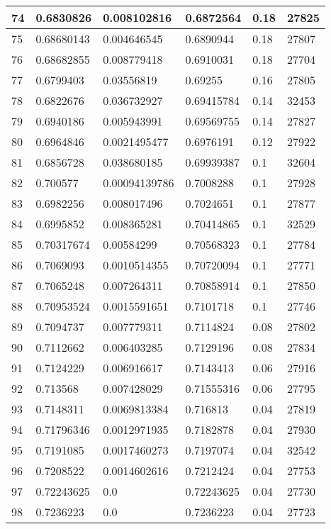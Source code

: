 \begin{longtable}{|l|l|l|l|l|l|}
74 & 0.6830826 & 0.008102816 & 0.6872564 & 0.18 & 27825 \\ \hline 
75 & 0.68680143 & 0.004646545 & 0.6890944 & 0.18 & 27807 \\ \hline 
76 & 0.68682855 & 0.008779418 & 0.6910031 & 0.18 & 27704 \\ \hline 
77 & 0.6799403 & 0.03556819 & 0.69255 & 0.16 & 27805 \\ \hline 
78 & 0.6822676 & 0.036732927 & 0.69415784 & 0.14 & 32453 \\ \hline 
79 & 0.6940186 & 0.005943991 & 0.69569755 & 0.14 & 27827 \\ \hline 
80 & 0.6964846 & 0.0021495477 & 0.6976191 & 0.12 & 27922 \\ \hline 
81 & 0.6856728 & 0.038680185 & 0.69939387 & 0.1 & 32604 \\ \hline 
82 & 0.700577 & 0.00094139786 & 0.7008288 & 0.1 & 27928 \\ \hline 
83 & 0.6982256 & 0.008017496 & 0.7024651 & 0.1 & 27877 \\ \hline 
84 & 0.6995852 & 0.008365281 & 0.70414865 & 0.1 & 32529 \\ \hline 
85 & 0.70317674 & 0.00584299 & 0.70568323 & 0.1 & 27784 \\ \hline 
86 & 0.7069093 & 0.0010514355 & 0.70720094 & 0.1 & 27771 \\ \hline 
87 & 0.7065248 & 0.007264311 & 0.70858914 & 0.1 & 27850 \\ \hline 
88 & 0.70953524 & 0.0015591651 & 0.7101718 & 0.1 & 27746 \\ \hline 
89 & 0.7094737 & 0.007779311 & 0.7114824 & 0.08 & 27802 \\ \hline 
90 & 0.7112662 & 0.006403285 & 0.7129196 & 0.08 & 27834 \\ \hline 
91 & 0.7124229 & 0.006916617 & 0.7143413 & 0.06 & 27916 \\ \hline 
92 & 0.713568 & 0.007428029 & 0.71555316 & 0.06 & 27795 \\ \hline 
93 & 0.7148311 & 0.0069813384 & 0.716813 & 0.04 & 27819 \\ \hline 
94 & 0.71796346 & 0.0012971935 & 0.7182878 & 0.04 & 27930 \\ \hline 
95 & 0.7191085 & 0.0017460273 & 0.7197074 & 0.04 & 32542 \\ \hline 
96 & 0.7208522 & 0.0014602616 & 0.7212424 & 0.04 & 27753 \\ \hline 
97 & 0.72243625 & 0.0 & 0.72243625 & 0.04 & 27730 \\ \hline 
98 & 0.7236223 & 0.0 & 0.7236223 & 0.04 & 27723 \\ \hline 

\end{longtable}
